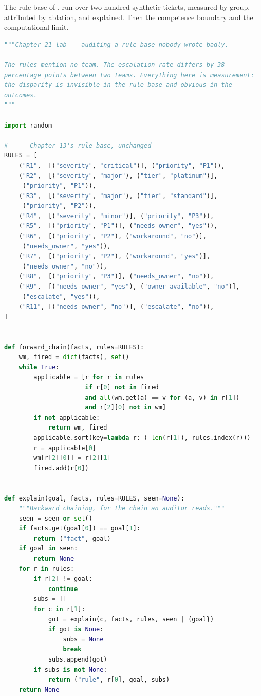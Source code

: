 \begin{lab}
The rule base of , run over two hundred synthetic tickets, measured by
group, attributed by ablation, and explained. Then the competence boundary and the
computational limit.
\begin{lstlisting}[language=Python]
"""Chapter 21 lab -- auditing a rule base nobody wrote badly.

The rules mention no team. The escalation rate differs by 38
percentage points between two teams. Everything here is measurement:
the disparity is invisible in the rule base and obvious in the
outcomes.
"""

import random

# ---- Chapter 13's rule base, unchanged ----------------------------
RULES = [
    ("R1",  [("severity", "critical")], ("priority", "P1")),
    ("R2",  [("severity", "major"), ("tier", "platinum")],
     ("priority", "P1")),
    ("R3",  [("severity", "major"), ("tier", "standard")],
     ("priority", "P2")),
    ("R4",  [("severity", "minor")], ("priority", "P3")),
    ("R5",  [("priority", "P1")], ("needs_owner", "yes")),
    ("R6",  [("priority", "P2"), ("workaround", "no")],
     ("needs_owner", "yes")),
    ("R7",  [("priority", "P2"), ("workaround", "yes")],
     ("needs_owner", "no")),
    ("R8",  [("priority", "P3")], ("needs_owner", "no")),
    ("R9",  [("needs_owner", "yes"), ("owner_available", "no")],
     ("escalate", "yes")),
    ("R11", [("needs_owner", "no")], ("escalate", "no")),
]


def forward_chain(facts, rules=RULES):
    wm, fired = dict(facts), set()
    while True:
        applicable = [r for r in rules
                      if r[0] not in fired
                      and all(wm.get(a) == v for (a, v) in r[1])
                      and r[2][0] not in wm]
        if not applicable:
            return wm, fired
        applicable.sort(key=lambda r: (-len(r[1]), rules.index(r)))
        r = applicable[0]
        wm[r[2][0]] = r[2][1]
        fired.add(r[0])


def explain(goal, facts, rules=RULES, seen=None):
    """Backward chaining, for the chain an auditor reads."""
    seen = seen or set()
    if facts.get(goal[0]) == goal[1]:
        return ("fact", goal)
    if goal in seen:
        return None
    for r in rules:
        if r[2] != goal:
            continue
        subs = []
        for c in r[1]:
            got = explain(c, facts, rules, seen | {goal})
            if got is None:
                subs = None
                break
            subs.append(got)
        if subs is not None:
            return ("rule", r[0], goal, subs)
    return None



\end{lstlisting}
\end{lab}
